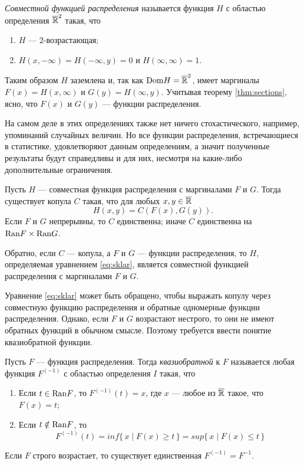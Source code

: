 \begin{define}
	\emph{Совместной функцией распределения} называется функция $H$ с областью определения $\overline{\mathbb{R}}^2$ такая, что
	\begin{enumerate}
	\item $H$ --- 2-возрастающая;
	\item $H(x, -\infty) = H(-\infty, y) = 0$ и $H(\infty, \infty) = 1$.
	\end{enumerate}
\end{define}

Таким образом $H$ заземлена и, так как $\mathrm{Dom}{H} = \overline{\mathbb{R}}^2$, имеет маргиналы $F(x) = H(x, \infty)$ и $G(y) = H(\infty, y)$. Учитывая теорему \ref{thm:sections}, ясно, что $F(x)$ и $G(y)$ --- функции распределения.

На самом деле в этих определениях также нет ничего стохастического, например, упоминаний случайных величин. Но все функции распределения, встречающиеся в статистике, удовлетворяют данным определениям, а значит полученные результаты будут справедливы и для них, несмотря на какие-либо дополнительные ограничения.

\begin{theorem}\label{thm:sklar}
	Пусть $H$ --- совместная функция распределения с маргиналами $F$ и $G$. Тогда существует копула $C$ такая, что для любых $x, y \in \overline{\mathbb{R}}$
\begin{equation}\label{eq:sklar}
	H(x, y) = C(F(x), G(y)).
\end{equation}
Если $F$ и $G$ непрерывны, то $C$ единственна; иначе $C$ единственна на $\mathrm{Ran}{F} \times \mathrm{Ran}{G}$.

Обратно, если $C$ --- копула, а $F$ и $G$ --- функции распределения, то $H$, определяемая уравнением \eqref{eq:sklar}, является совместной функцией распределения с маргиналами $F$ и $G$.
\end{theorem}

Уравнение \eqref{eq:sklar} может быть обращено, чтобы выражать копулу через совместную функцию распределения и обратные одномерные функции распределения. Однако, если $F$ и $G$ возрастают нестрого, то они не имеют обратных функций в обычном смысле. Поэтому требуется ввести понятие квазиобратной функции.

\begin{define}
	Пусть $F$ --- функция распределения. Тогда \emph{квазиобратной} к $F$ называется любая функция $F^{(-1)}$ с областью определения $I$ такая, что
	\begin{enumerate}
	\item Если $t \in \mathrm{Ran}{F}$, то $F^{(-1)}(t) = x$, где $x$ --- любое из $\overline{\mathbb{R}}$ такое, что $F(x) = t$;
	\item Если $t \notin \mathrm{Ran}{F}$, то
	\[
	F^{(-1)}(t) = inf \{\, x \mid F(x) \geqslant t \,\} = sup \{\, x \mid F(x) \leqslant t \,\}
	\]
	\end{enumerate}
\end{define}
Если $F$ строго возрастает, то существует единственная $F^{(-1)} = F^{-1}$.

